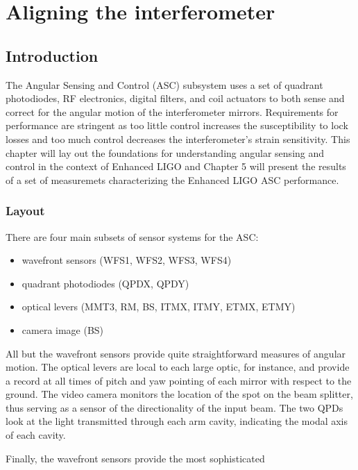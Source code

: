 \chapter{Aligning the interferometer}

\section{Introduction}
The Angular Sensing and Control (ASC) subsystem uses a set of quadrant
photodiodes, RF electronics, digital filters, and coil actuators to
both sense and correct for the angular motion of the interferometer
mirrors. Requirements for performance are stringent as too little
control increases the susceptibility to lock losses and too much
control decreases the interferometer's strain sensitivity. This
chapter will lay out the foundations for understanding angular sensing
and control in the context of Enhanced LIGO and Chapter 5 will present
the results of a set of measuremets characterizing the Enhanced LIGO ASC
performance. 



\subsection{Layout}
There are four main subsets of sensor systems for the ASC:
\begin{itemize}
\item wavefront sensors (WFS1, WFS2, WFS3, WFS4) \vspace{-10pt}
\item quadrant photodiodes (QPDX, QPDY) \vspace{-10pt}
\item optical levers (MMT3, RM, BS, ITMX, ITMY, ETMX, ETMY) \vspace{-10pt}
\item camera image (BS)
\end{itemize}
All but the wavefront sensors provide quite straightforward measures
of angular motion. The optical levers are local to each
large optic, for instance, and provide a record at all times of pitch and yaw
pointing of each mirror with respect to the ground. The video camera
monitors the location of the spot on the beam splitter,
thus serving as a sensor of the directionality of the input beam. The
two QPDs look at the light transmitted through each arm cavity,
indicating the modal axis of each cavity.

Finally, the wavefront sensors provide the most sophisticated 


